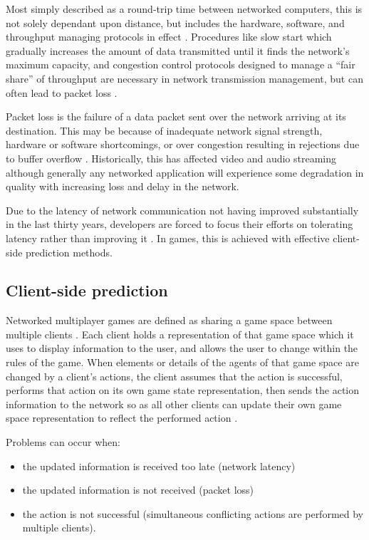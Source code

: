 \documentclass[journal]{IEEEtran}
\begin{document}
Most simply described as a round-trip time between networked computers, this is not solely dependant upon distance, but includes the hardware, software, and throughput managing protocols in effect \cite{quax2004objective}. Procedures like slow start \cite{stevens1997tcp} which gradually increases the amount of data transmitted until it finds the network's maximum capacity, and congestion control protocols designed to manage a ``fair share'' of throughput \cite{vicisano1998tcp} \cite{padhye1998modeling} are necessary in network transmission management, but can often lead to packet loss \cite{cardwell2000modeling}.

Packet loss is the failure of a data packet sent over the network arriving at its destination. This may be because of inadequate network signal strength, hardware or software shortcomings, or over congestion resulting in rejections due to buffer overflow \cite{bolot1993end}. Historically, this has affected video and audio streaming \cite{perkins1998survey} \cite{kanumuri2006modeling} \cite{zhang2000video} although generally any networked application will experience some degradation in quality with increasing loss and delay in the network.

Due to the latency of network communication not having improved substantially in the last thirty years, developers are forced to focus their efforts on tolerating latency rather than improving it \cite{rumble2011s}. In games, this is achieved with effective client-side prediction methods.

\subsection{Client-side prediction} \label{clientSidePrediction}

Networked multiplayer games are defined as sharing a game space between multiple clients \cite{diot1999distributed}. Each client holds a representation of that game space which it uses to display information to the user, and allows the user to change within the rules of the game. When elements or details of the agents of that game space are changed by a client's actions, the client assumes that the action is successful, performs that action on its own game state representation, then sends the action information to the network so as all other clients can update their own game space representation to reflect the performed action \cite{bernier2001latency}.

Problems can occur when:
\begin{itemize}
    \item the updated information is received too late (network latency)
    \item the updated information is not received (packet loss)
    \item the action is not successful (simultaneous conflicting actions are performed by multiple clients).
\end{itemize}
\end{document}
